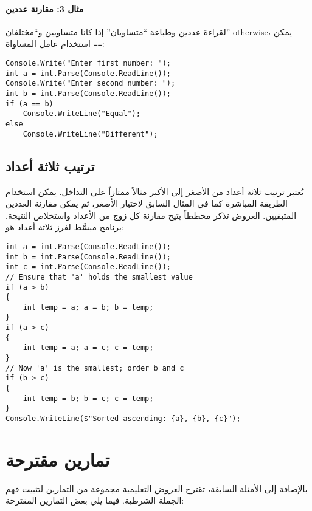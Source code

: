 ﻿\documentclass[12pt]{article}
\begin{document}
\paragraph{مثال 3: مقارنة عددين} لقراءة عددين وطباعة ``متساويان'' إذا كانا متساويين و``مختلفان'' otherwise، يمكن استخدام عامل المساواة \verb|==|:


\begin{english}
\begin{verbatim}
Console.Write("Enter first number: ");
int a = int.Parse(Console.ReadLine());
Console.Write("Enter second number: ");
int b = int.Parse(Console.ReadLine());
if (a == b)
    Console.WriteLine("Equal");
else
    Console.WriteLine("Different");
\end{verbatim}
\end{english}

\subsection{ترتيب ثلاثة أعداد}

يُعتبر ترتيب ثلاثة أعداد من الأصغر إلى الأكبر مثالاً ممتازاً على التداخل. يمكن استخدام الطريقة المباشرة كما في المثال السابق لاختيار الأصغر، ثم يمكن مقارنة العددين المتبقيين. العروض تذكر مخططاً يتيح مقارنة كل زوج من الأعداد واستخلاص النتيجة. برنامج مبسَّط لفرز ثلاثة أعداد هو:


\begin{english}
\begin{verbatim}
int a = int.Parse(Console.ReadLine());
int b = int.Parse(Console.ReadLine());
int c = int.Parse(Console.ReadLine());
// Ensure that 'a' holds the smallest value
if (a > b)
{
    int temp = a; a = b; b = temp;
}
if (a > c)
{
    int temp = a; a = c; c = temp;
}
// Now 'a' is the smallest; order b and c
if (b > c)
{
    int temp = b; b = c; c = temp;
}
Console.WriteLine($"Sorted ascending: {a}, {b}, {c}");
\end{verbatim}
\end{english}

\section{تمارين مقترحة}

بالإضافة إلى الأمثلة السابقة، تقترح العروض التعليمية مجموعة من التمارين لتثبيت فهم الجملة الشرطية. فيما يلي بعض التمارين المقترحة:
\end{document}
